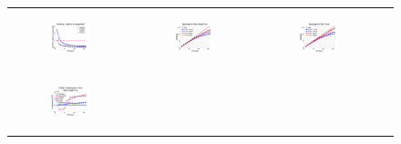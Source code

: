 \documentclass{article} %
\begin{document}
\begin{figure}[ht]
  \centering
  \begin{tabular}{cccc}
	  \begin{subfigure}[h]{0.30\textwidth}
	  	\includegraphics[width=150pt]{images/summary_relruntime.png}
			\caption{}
			\label{fig:relruntime}
	  \end{subfigure} &
	  \begin{subfigure}[h]{0.30\textwidth}
	  	\includegraphics[width=150pt]{images/summary_speedup_maxgraphcut.png}
			\caption{}
			\label{fig:speedup_maxgraphcut}
	  \end{subfigure} &
	  \begin{subfigure}[h]{0.30\textwidth}
	  	\includegraphics[width=150pt]{images/summary_speedup_setcover.png}
			\caption{}
			\label{fig:speedup_setcover}
	  \end{subfigure} \\
	  \begin{subfigure}[h]{0.30\textwidth}
	  	\includegraphics[width=150pt]{images/summary_diffFA_maxgraphcut.png}

\end{subfigure}
\end{tabular}
\end{figure}
\end{document}
